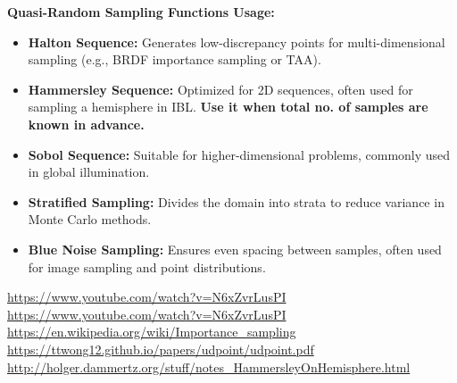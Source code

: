\documentclass{article}
\begin{document}
\textbf{Quasi-Random Sampling Functions Usage:}
\begin{itemize}
    \item \textbf{Halton Sequence:} Generates low-discrepancy points for multi-dimensional sampling (e.g., BRDF importance sampling or TAA).
    \item \textbf{Hammersley Sequence:} Optimized for 2D sequences, often used for sampling a hemisphere in IBL. \textbf{Use it when total no. of samples are known in advance.}
    \item \textbf{Sobol Sequence:} Suitable for higher-dimensional problems, commonly used in global illumination.
    \item \textbf{Stratified Sampling:} Divides the domain into strata to reduce variance in Monte Carlo methods.
    \item \textbf{Blue Noise Sampling:} Ensures even spacing between samples, often used for image sampling and point distributions.
\end{itemize}
\begin{thebibliography}{10}
	 \url{https://www.youtube.com/watch?v=N6xZvrLusPI}
	 \url{https://www.youtube.com/watch?v=N6xZvrLusPI}
	 \url{https://en.wikipedia.org/wiki/Importance_sampling}
	 \url{https://ttwong12.github.io/papers/udpoint/udpoint.pdf}
	 \url{http://holger.dammertz.org/stuff/notes_HammersleyOnHemisphere.html}
\end{thebibliography}

\end{document}
